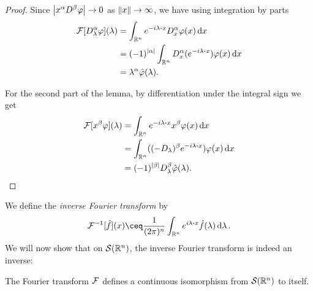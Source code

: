 \begin{proof}
	Since $\abs{x^\alpha D^\beta\varphi} \to 0$ as $\norm{x} \to \infty$, we have using integration by parts
	\begin{align*}
		\FF[D_\lambda^\alpha\phi](\lambda) &= \int_{\RR^n} e^{-i\lambda \vdot x} D_x^\alpha \phi(x) \dd{x} \\
		&= (-1)^{\abs{\alpha}} \int_{\RR^n} D_x^\alpha(e^{-i\lambda \vdot x}) \phi(x) \dd{x} \\
		&= \lambda^\alpha\hat\phi(\lambda). 
	\end{align*}
	
	For the second part of the lemma, by differentiation under the integral sign we get
	\begin{align*}
		 \FF[x^\beta \phi](\lambda) &=  \int_{\RR^n} e^{-i\lambda \vdot x} x^\beta \phi(x) \dd{x} \\
		 &= \int_{\RR^n} ((-D_\lambda)^\beta e^{-i\lambda \vdot x}) \phi(x) \dd{x} \\
		 &= (-1)^{\abs{\beta}} D_\lambda^\beta \hat\phi(\lambda).
	\end{align*}
\end{proof}


We define the \emph{inverse Fourier transform} by 
\[
\FF^{-1}[\hat f](x)  \ceq \frac{1}{(2\pi)^n} \int_{\RR^n} e^{i\lambda \vdot x} \hat f(\lambda) \dd{\lambda}. 
\]
We will now show that on $\mathcal S(\mathbb R^n)$, the inverse Fourier transform is indeed an inverse:
\begin{theorem} \label{thm:fourier_transform_isomorphism}
	The Fourier transform $\mathcal F$ defines a continuous isomorphism from $\mathcal S(\mathbb R^n)$ to itself. 
\end{theorem}

